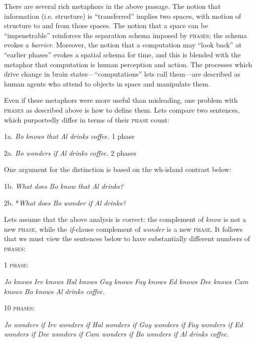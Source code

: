   There are several rich metaphors in the above passage. The notion that information (i.e. structure) is “transferred” implies two spaces, with motion of structure to and from those spaces. The notion that a space can be “impenetrable” reinforces the separation schema imposed by \textsc{phases}; the schema evokes a \textit{barrier}. Moreover, the notion that a computation may “look back” at “earlier phases” evokes a spatial schema for time, and this is blended with the metaphor that computation is human perception and action. The processes which drive change in brain states—“computations” lets call them—are described as human agents who attend to objects in space and manipulate them.

  Even if these metaphors were more useful than misleading, one problem with \textsc{phases} as described above is how to define them. Lets compare two sentences, which purportedly differ in terms of their \textsc{phase} count:

1a. \textit{Bo knows that Al drinks coffee.}  1 phase

2a. \textit{Bo wonders if Al drinks coffee.}  2 phases

One argument for the distinction is based on the wh-island contrast below:

  1b. \textit{What does Bo know that Al drinks?}

  2b. *\textit{What does Bo wonder if Al drinks?}

  Lets assume that the above analysis is correct: the complement of \textit{know} is not a new \textsc{phase}, while the \textit{if}{}-clause complement of \textit{wonder} is a new \textsc{phase}. It follows that we must view the sentences below to have substantially different numbers of \textsc{phases}:

1 \textsc{phase}:

\textit{Jo knows Irv knows Hal knows Guy knows Fay knows Ed knows Dee knows Cam knows Bo knows Al drinks coffee.}

10 \textsc{phases}:

\textit{Jo wonders if Irv wonders if Hal wonders if Guy wonders if Fay wonders if Ed wonders if Dee wonders if Cam wonders if Bo wonders if Al drinks coffee.}

